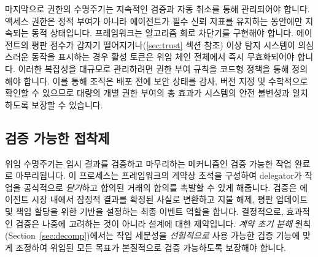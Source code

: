 \documentclass[11pt, a4paper, twocolumn, copyright, goog]{google}
\begin{document}
마지막으로 권한의 수명주기는 지속적인 검증과 자동 취소를 통해 관리되어야 합니다. 액세스 권한은 정적 부여가 아니라 에이전트가 필수 신뢰 지표를 유지하는 동안에만 지속되는 동적 상태입니다. 프레임워크는 알고리즘 회로 차단기를 구현해야 합니다. 에이전트의 평판 점수가 갑자기 떨어지거나(\ref{sec:trust} 섹션 참조) 이상 탐지 시스템이 의심스러운 동작을 표시하는 경우 활성 토큰은 위임 체인 전체에서 즉시 무효화되어야 합니다. 이러한 복잡성을 대규모로 관리하려면 권한 부여 규칙을 코드형 정책을 통해 정의해야 합니다. 이를 통해 조직은 배포 전에 보안 상태를 감사, 버전 지정 및 수학적으로 확인할 수 있으므로 대량의 개별 권한 부여의 총 효과가 시스템의 안전 불변성과 일치하도록 보장할 수 있습니다.

\subsection{검증 가능한 접착제}
\label{sec:verify}

위임 수명주기는 임시 결과를 검증하고 마무리하는 메커니즘인 검증 가능한 작업 완료로 마무리됩니다. 이 프로세스는 프레임워크의 계약상 초석을 구성하여 delegator가 작업을 공식적으로 \emph{닫기}하고 합의된 거래의 합의를 촉발할 수 있게 해줍니다. 검증은 에이전트 시장 내에서 잠정적 결과를 확정된 사실로 변환하고 지불 해제, 평판 업데이트 및 책임 할당을 위한 기반을 설정하는 최종 이벤트 역할을 합니다. 결정적으로, 효과적인 검증은 나중에 고려하는 것이 아니라 설계에 대한 제약입니다. \emph{계약 초기 분해} 원칙(Section~\ref{sec:decomp})에서는 작업 세분성을 \emph{선험적으로} 사용 가능한 검증 기능에 맞게 조정하여 위임된 모든 목표가 본질적으로 검증 가능하도록 보장해야 합니다.
\end{document}
